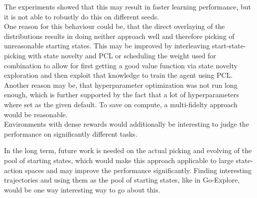 \documentclass{article}
\begin{document}
The experiments showed that this may result in faster learning performance, but it is not able to robustly do this on different seeds. \\
One reason for this behaviour could be, that the direct overlaying of the distributions results in doing neither approach well and therefore picking of unreasonable starting states. This may be improved by interleaving start-state-picking with state novelty and PCL or scheduling the weight used for combination to allow for first getting a good value function via state novelty exploration and then exploit that knowledge to train the agent using PCL. \\
Another reason may be, that hyperparameter optimization was not run long enough, which is further supported by the fact that a lot of hyperparameters where set as the given default. To save on compute, a multi-fidelty approach would be reasonable. \\
Environments with dense rewards would additionally be interesting to judge the performance on significantly different tasks.

In the long term, future work is needed on the actual picking and evolving of the pool of starting states, which would make this approach applicable to large state-action spaces and may improve the performance significantly. Finding interesting trajectories and using them as the pool of starting states, like in Go-Explore, would be one way interesting way to go about this.



\newpage



\newpage
\end{document}
